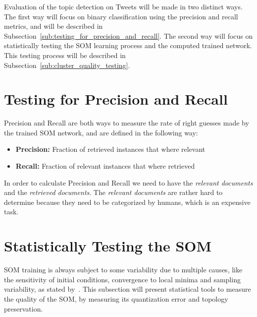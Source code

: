 
Evaluation of the topic detection on Tweets will be made in two distinct ways. The first way will focus on  binary classification using the precision and recall metrics, and will be described in Subsection~\ref{sub:testing_for_precision_and_recall}. The second way will focus on statistically testing the SOM learning process and the computed trained network. This testing process will be described in Subsection~\ref{sub:cluster_quality_testing}. 

\section{Testing for Precision and Recall} 
\label{sec:testing_for_precision_and_recall}
Precision and Recall are both ways to measure the rate of right guesses made by the trained SOM network, and are defined in the following way:
\begin{itemize}
  \item \textbf{Precision:} Fraction of retrieved instances that where relevant 
    
  \item \textbf{Recall:} Fraction of relevant instances that where retrieved
    
\end{itemize}

In order to calculate Precision and Recall we need to have the \emph{relevant documents} and the \emph{retrieved documents}. The \emph{relevant documents} are rather hard to determine because they need to be categorized by humans, which is an expensive task.

\section{Statistically Testing the SOM} 
\label{sec:cluster_quality_testing}
SOM training is always subject to some variability due to multiple causes, like the sensitivity of initial conditions, convergence to local minima and sampling variability, as stated by~\citet{Bodt}. This subsection will present statistical tools to measure the quality of the SOM, by measuring its quantization error and topology preservation.

